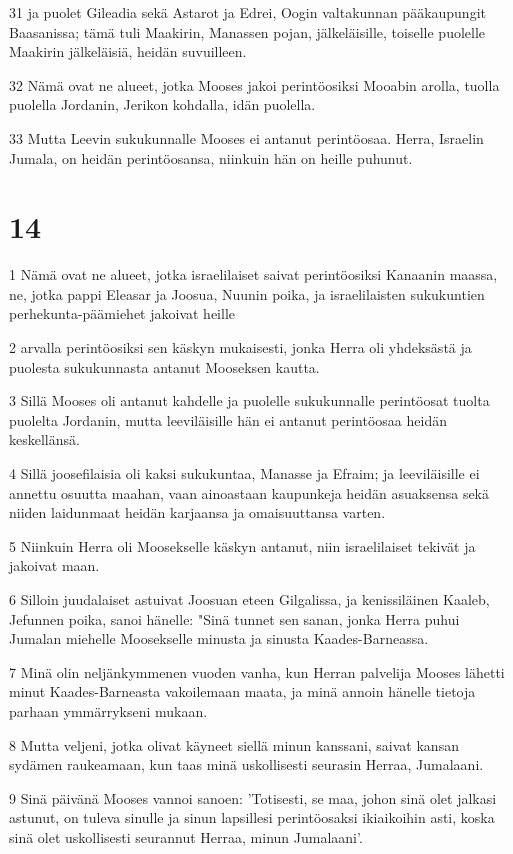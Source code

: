 \par 31 ja puolet Gileadia sekä Astarot ja Edrei, Oogin valtakunnan pääkaupungit Baasanissa; tämä tuli Maakirin, Manassen pojan, jälkeläisille, toiselle puolelle Maakirin jälkeläisiä, heidän suvuilleen.
\par 32 Nämä ovat ne alueet, jotka Mooses jakoi perintöosiksi Mooabin arolla, tuolla puolella Jordanin, Jerikon kohdalla, idän puolella.
\par 33 Mutta Leevin sukukunnalle Mooses ei antanut perintöosaa. Herra, Israelin Jumala, on heidän perintöosansa, niinkuin hän on heille puhunut.

\chapter{14}

\par 1 Nämä ovat ne alueet, jotka israelilaiset saivat perintöosiksi Kanaanin maassa, ne, jotka pappi Eleasar ja Joosua, Nuunin poika, ja israelilaisten sukukuntien perhekunta-päämiehet jakoivat heille
\par 2 arvalla perintöosiksi sen käskyn mukaisesti, jonka Herra oli yhdeksästä ja puolesta sukukunnasta antanut Mooseksen kautta.
\par 3 Sillä Mooses oli antanut kahdelle ja puolelle sukukunnalle perintöosat tuolta puolelta Jordanin, mutta leeviläisille hän ei antanut perintöosaa heidän keskellänsä.
\par 4 Sillä joosefilaisia oli kaksi sukukuntaa, Manasse ja Efraim; ja leeviläisille ei annettu osuutta maahan, vaan ainoastaan kaupunkeja heidän asuaksensa sekä niiden laidunmaat heidän karjaansa ja omaisuuttansa varten.
\par 5 Niinkuin Herra oli Moosekselle käskyn antanut, niin israelilaiset tekivät ja jakoivat maan.
\par 6 Silloin juudalaiset astuivat Joosuan eteen Gilgalissa, ja kenissiläinen Kaaleb, Jefunnen poika, sanoi hänelle: "Sinä tunnet sen sanan, jonka Herra puhui Jumalan miehelle Moosekselle minusta ja sinusta Kaades-Barneassa.
\par 7 Minä olin neljänkymmenen vuoden vanha, kun Herran palvelija Mooses lähetti minut Kaades-Barneasta vakoilemaan maata, ja minä annoin hänelle tietoja parhaan ymmärrykseni mukaan.
\par 8 Mutta veljeni, jotka olivat käyneet siellä minun kanssani, saivat kansan sydämen raukeamaan, kun taas minä uskollisesti seurasin Herraa, Jumalaani.
\par 9 Sinä päivänä Mooses vannoi sanoen: 'Totisesti, se maa, johon sinä olet jalkasi astunut, on tuleva sinulle ja sinun lapsillesi perintöosaksi ikiaikoihin asti, koska sinä olet uskollisesti seurannut Herraa, minun Jumalaani'.
